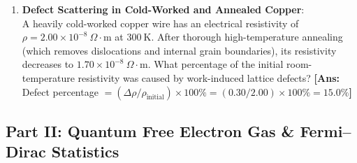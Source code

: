 \documentclass[11pt,a4paper]{article}
\begin{document}
\begin{enumerate}[label=\textbf{\arabic*.}, leftmargin=*]
    \item \textbf{Defect Scattering in Cold-Worked and Annealed Copper}:\\
    A heavily cold-worked copper wire has an electrical resistivity of $\rho = 2.00 \times 10^{-8}\ \Omega\cdot\mathrm{m}$ at $300\ \mathrm{K}$. After thorough high-temperature annealing (which removes dislocations and internal grain boundaries), its resistivity decreases to $1.70 \times 10^{-8}\ \Omega\cdot\mathrm{m}$. What percentage of the initial room-temperature resistivity was caused by work-induced lattice defects?
    \textbf{[Ans:} Defect percentage $= (\Delta\rho/\rho_{\mathrm{initial}}) \times 100\% = (0.30/2.00) \times 100\% = 15.0\%$\textbf{]}
\end{enumerate}

\vspace{0.4cm}

\subsection*{Part II: Quantum Free Electron Gas \& Fermi--Dirac Statistics}
\end{document}
